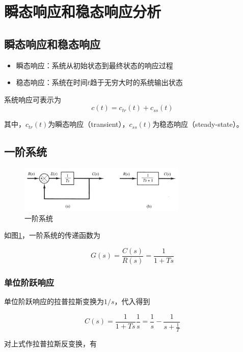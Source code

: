 \section{瞬态响应和稳态响应分析}
\subsection{瞬态响应和稳态响应}
\begin{itemize}
	\item	瞬态响应：系统从初始状态到最终状态的响应过程
	\item	稳态响应：系统在时间$t$趋于无穷大时的系统输出状态
\end{itemize}

系统响应可表示为
\begin{equation*}
c(t)=c_{tr}(t)+c_{ss}(t)
\end{equation*}

其中，$c_{tr}(t)$为瞬态响应（transient），$c_{ss}(t)$为稳态响应（steady-state）。

\subsection{一阶系统}

\begin{figure}[!ht]
	\centering
	\includegraphics[width=8cm]{figures/5.png}
	\caption{一阶系统}
	\label{5}
\end{figure}

如图\ref{5}，一阶系统的传递函数为

\begin{equation*}
G(s)=\frac{C(s)}{R(s)}=\frac{1}{1+Ts}
\end{equation*}

\subsubsection{单位阶跃响应}

单位阶跃响应的拉普拉斯变换为$1/s$，代入得到

\begin{equation*}
C(s)=\frac{1}{1+Ts}\frac{1}{s}=\frac{1}{s}-\frac{1}{s+\frac1T}
\end{equation*}

对上式作拉普拉斯反变换，有

